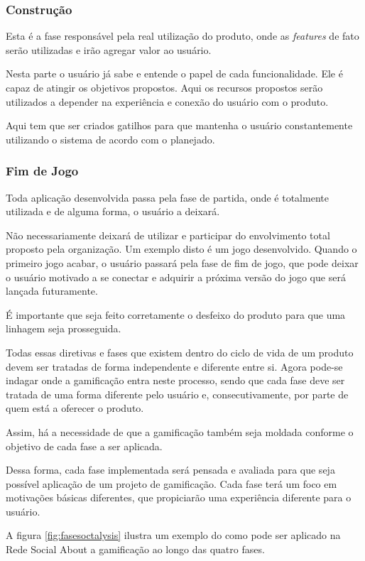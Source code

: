 \subsubsection{Construção}
\label{sub:constru_o}
Esta é a fase responsável pela real utilização do produto, onde as \textit{features}
de fato serão utilizadas e irão agregar valor ao usuário.

Nesta parte o usuário já sabe e entende o papel de cada funcionalidade. Ele é capaz
de atingir os objetivos propostos. Aqui os recursos propostos serão utilizados
a depender na experiência e conexão do usuário com o produto.

Aqui tem que ser criados gatilhos para que mantenha o usuário constantemente utilizando
o sistema de acordo com o planejado.

\subsubsection{Fim de Jogo}
\label{sub:fim_de_jogo}
Toda aplicação desenvolvida passa pela fase de partida, onde é totalmente utilizada
e de alguma forma, o usuário a deixará.

Não necessariamente deixará de utilizar e participar do envolvimento total proposto pela
organização. Um exemplo disto é um jogo desenvolvido. Quando o primeiro jogo acabar, o
usuário passará pela fase de fim de jogo, que pode deixar o usuário motivado a se conectar
e adquirir a próxima versão do jogo que será lançada futuramente.

É importante que seja feito corretamente o desfeixo do produto para que uma linhagem seja
prosseguida.


Todas essas diretivas e fases que existem dentro do ciclo de vida de um produto
devem ser
tratadas de forma independente e diferente entre si. Agora pode-se indagar onde
a gamificação
entra neste processo, sendo que cada fase deve ser tratada de uma forma diferente pelo
usuário e, consecutivamente, por parte de quem está a oferecer o produto.

Assim, há a necessidade de que a gamificação também seja moldada conforme o objetivo de
cada fase a ser aplicada.

Dessa forma, cada fase implementada será pensada e avaliada para que seja possível
aplicação de um  projeto de gamificação. Cada fase terá um foco em motivações
básicas diferentes, que propiciarão uma experiência diferente para o usuário.

A figura \ref{fig:fasesoctalysis} ilustra um exemplo do como pode ser aplicado na
Rede Social About a gamificação ao longo das quatro fases.

